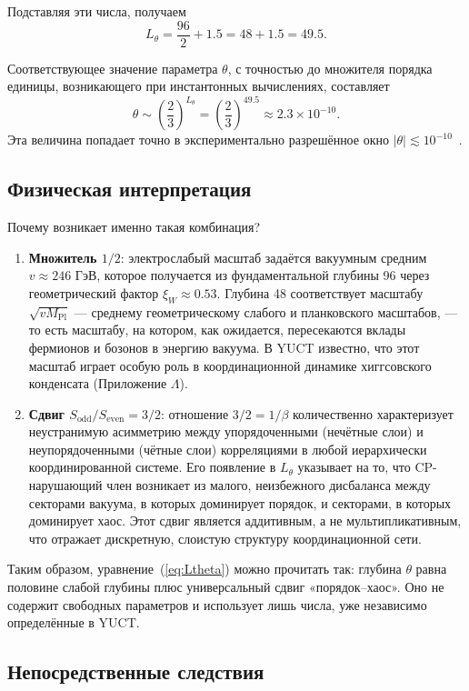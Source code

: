 \documentclass[11pt,a4paper]{article}
\begin{document}
	Подставляя эти числа, получаем
	\[
	L_\theta = \frac{96}{2} + 1.5 = 48 + 1.5 = 49.5.
	\]
	
	Соответствующее значение параметра \(\theta\), с точностью до множителя порядка единицы, возникающего при инстантонных вычислениях, составляет
	\[
	\theta \sim \left(\frac{2}{3}\right)^{L_\theta} = \left(\frac{2}{3}\right)^{49.5} \approx 2.3 \times 10^{-10}.
	\]
	Эта величина попадает точно в экспериментально разрешённое окно \(|\theta| \lesssim 10^{-10}\)~\cite{nEDM2020}.
	
	\subsection{Физическая интерпретация}
	
	Почему возникает именно такая комбинация?
	\begin{enumerate}
		\item \textbf{Множитель \(1/2\)}: электрослабый масштаб задаётся вакуумным средним \(v \approx 246\) ГэВ, которое получается из фундаментальной глубины 96 через геометрический фактор \(\xi_W \approx 0.53\). Глубина 48 соответствует масштабу \(\sqrt{v M_{\mathrm{Pl}}}\) — среднему геометрическому слабого и планковского масштабов, — то есть масштабу, на котором, как ожидается, пересекаются вклады фермионов и бозонов в энергию вакуума. В YUCT известно, что этот масштаб играет особую роль в координационной динамике хиггсовского конденсата (Приложение \(\Lambda\)).
		\item \textbf{Сдвиг \(S_{\mathrm{odd}}/S_{\mathrm{even}} = 3/2\)}: отношение \(3/2 = 1/\beta\) количественно характеризует неустранимую асимметрию между упорядоченными (нечётные слои) и неупорядоченными (чётные слои) корреляциями в любой иерархически координированной системе. Его появление в \(L_\theta\) указывает на то, что CP-нарушающий член возникает из малого, неизбежного дисбаланса между секторами вакуума, в которых доминирует порядок, и секторами, в которых доминирует хаос. Этот сдвиг является аддитивным, а не мультипликативным, что отражает дискретную, слоистую структуру координационной сети.
	\end{enumerate}
	
	Таким образом, уравнение~(\ref{eq:Ltheta}) можно прочитать так: глубина \(\theta\) равна половине слабой глубины плюс универсальный сдвиг «порядок–хаос». Оно не содержит свободных параметров и использует лишь числа, уже независимо определённые в YUCT.
	
	\subsection{Непосредственные следствия}
	
\end{document}
